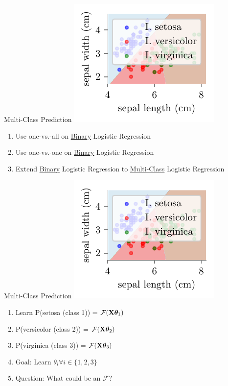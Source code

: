 \documentclass{beamer}
\begin{document}
\begin{frame}{Multi-Class Prediction}
\includegraphics{../assets/logistic-regression/figures/logisitic-iris-prediction.pdf}
\pause \begin{enumerate}
\item Use one-vs.-all on \underline{Binary} Logistic Regression
\item Use one-vs.-one on \underline{Binary} Logistic Regression
\item Extend \underline{Binary} Logistic Regression to \underline{Multi-Class} Logistic Regression
\end{enumerate}
\end{frame}

\begin{frame}{Multi-Class Prediction}
\includegraphics[scale=0.8]{../assets/logistic-regression/figures/logisitic-iris-prediction.pdf}
\pause \begin{enumerate}
	\item Learn P(setosa (class 1)) = $\mathcal{F}({\mathbf{X}\boldsymbol{\theta}_1})$
	\item P(versicolor (class 2)) = $\mathcal{F}({\mathbf{X}\boldsymbol{\theta}_2})$
	\item P(virginica (class 3)) = $\mathcal{F}({\mathbf{X}\boldsymbol{\theta}_3})$
	\item Goal: Learn $\theta_i \forall i \in \{1, 2, 3\}$
	\item Question: What could be an $\mathcal{F}?$

\end{enumerate}


\end{frame}
\end{document}

